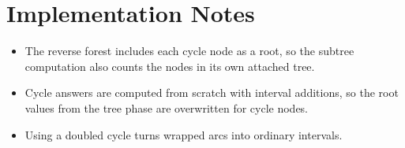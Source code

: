 \documentclass[11pt]{article}
\begin{document}
\section*{Implementation Notes}

\begin{itemize}[leftmargin=*]
    \item The reverse forest includes each cycle node as a root, so the subtree computation also counts the nodes in its own attached tree.
    \item Cycle answers are computed from scratch with interval additions, so the root values from the tree phase are overwritten for cycle nodes.
    \item Using a doubled cycle turns wrapped arcs into ordinary intervals.
\end{itemize}
\end{document}
